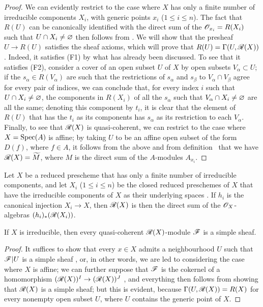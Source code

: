 \begin{proof}
\label{proof-1.7.3.3}
We can evidently restrict to the case where $X$ has only a finite number of irreducible components $X_i$, with generic points $x_i$ ($1\leqslant i\leqslant n$).
The fact that $R(U)$ can be canonically identified with the direct sum of the $\mathscr{O}_{x_i}=R(X_i)$ such that $U\cap X_i\neq\varnothing$ then follows from .
We will show that the presheaf $U\to R(U)$ satisfies the sheaf axioms, which will prove that $R(U)=\Gamma(U,\mathscr{R}(X))$.
Indeed, it satisfies (F1) by what has already been discussed.
To see that it satisfies (F2), consider a cover of an open subset $U$ of $X$ by open subsets $V_\alpha\subset U$; if the $s_\alpha\in R(V_\alpha)$ are such that the restrictions of $s_\alpha$ and $s_\beta$ to $V_\alpha\cap V_\beta$ agree for every pair of indices, we can conclude that, for every index $i$ such that $U\cap X_i\neq\varnothing$, the components in $R(X_i)$ of all the $s_\alpha$ such that $V_\alpha\cap X_i\neq\varnothing$ are all the same; denoting this component by $t_i$, it is clear that the element of $R(U)$ that has the $t_i$ as its components has $s_\alpha$ as its restriction to each $V_\alpha$.
Finally, to see that $\mathscr{R}(X)$ is quasi-coherent, we can restrict to the case where $X={\mathop{\mathrm{Spec}}\nolimits}(A)$ is affine; by taking $U$ to be an affine open subset of the form $D(f)$, where $f\in A$, it follows from the above and from definition~ that we have $\mathscr{R}(X)=\widetilde{M}$, where $M$ is the direct sum of the $A$-modules $A_{x_i}$.
\end{proof}

\begin{cor}[7.3.4]
\label{1.7.3.4}
Let $X$ be a reduced prescheme that has only a finite number of irreducible components, and let $X_i$ ($1\leqslant i\leqslant n$) be the closed reduced preschemes of $X$ that have the irreducible components of $X$ as their underlying spaces .
If $h_i$ is the canonical injection $X_i\to X$, then $\mathscr{R}(X)$ is then the direct sum of the $\mathscr{O}_X$-algebras $(h_i)_*(\mathscr{R}(X_i))$.
\end{cor}

\begin{cor}[7.3.5]
\label{1.7.3.5}
If $X$ is irreducible, then every quasi-coherent $\mathscr{R}(X)$-module $\mathscr{F}$ is a simple sheaf.
\end{cor}

\begin{proof}
\label{proof-1.7.3.5}
It suffices to show that every $x\in X$ admits a neighbourhood $U$ such that $\mathscr{F}|U$ is a simple sheaf , or, in other words, we are led to considering the case where $X$ is affine; we can further suppose that $\mathscr{F}$ is the cokernel of a homomorphism $(\mathscr{R}(X))^{I}\to(\mathscr{R}(X))^{J}$ , and everything then follows from showing that $\mathscr{R}(X)$ is a simple sheaf; but this is evident, because $\Gamma(U,\mathscr{R}(X))=R(X)$ for every nonempty open subset $U$, where $U$ contains the generic point of $X$.
\end{proof}

